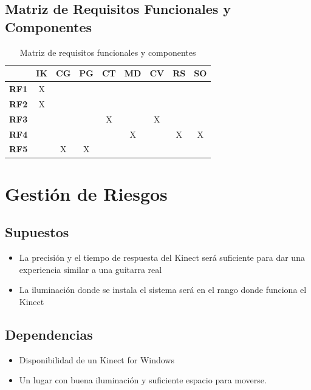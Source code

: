 \documentclass[a4paper,12pt]{article}
\begin{document}
\subsection{Matriz de Requisitos Funcionales y Componentes}
\begin{table}[h!]
        \centering
        \begin{tabular}{|c|c|c|c|c|c|c|c|c|}
                \hline
                 & \textbf{IK} & \textbf{CG} & \textbf{PG} & \textbf{CT} &
                 \textbf{MD} & \textbf{CV} & \textbf{RS} & \textbf{SO} \\
                \hline
                \textbf{RF1} & X & & & & & & & \\
                \hline
                \textbf{RF2} & X & & & & & & & \\
                \hline
                \textbf{RF3} & & & & X & & X & & \\
                \hline
                \textbf{RF4} & & & & & X & & X & X \\
                \hline
                \textbf{RF5} & & X & X & & & & & \\
                \hline
        \end{tabular}
        \caption{Matriz de requisitos funcionales y componentes}
        \label{tab:matrizrequisitos}
\end{table}

\section{Gestión de Riesgos}
\subsection{Supuestos}
\begin{itemize}
        \item La precisión y el tiempo de respuesta del Kinect será suficiente
                para dar una experiencia similar a una guitarra real
        \item La iluminación donde se instala el sistema será en el rango donde
                funciona el Kinect
\end{itemize}

\subsection{Dependencias}
\begin{itemize}
        \item Disponibilidad de un Kinect for Windows
        \item Un lugar con buena iluminación y suficiente espacio para moverse.
\end{itemize}
\end{document}
